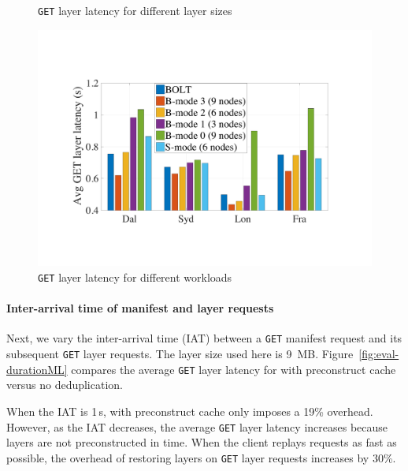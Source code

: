 \begin{figure}[t]
\begin{minipage}{0.3\textwidth}
		\caption{\texttt{GET} layer latency for different layer sizes}
		\label{fig:eval-dalprimary}
	\end{minipage}%
	\hspace{1mm}
	\begin{minipage}{0.3\textwidth}
		\centering
		\includegraphics[width=\textwidth]{graphs/total-traces.pdf}
		\caption{\texttt{GET} layer latency for different workloads} %
		\label{fig:eval-total-traces}
	\end{minipage}
\end{figure}
 
\paragraph{Inter-arrival time of manifest and layer requests}
%
Next, we vary the inter-arrival time (IAT) between a \texttt{GET} manifest request and its
subsequent \texttt{GET} layer requests.
%
The layer size used here is 9~MB.
%
Figure~\ref{fig:eval-durationML} compares the average \texttt{GET} layer latency for
\sysname with preconstruct cache versus no deduplication.

When the IAT is 1\,s, \sysname with preconstruct cache only imposes a 19\% overhead.
%
However, as the IAT decreases, the average \texttt{GET} layer latency increases because
layers are not preconstructed in time.
%
When the client replays requests as fast as possible, the overhead of restoring layers on
\texttt{GET} layer requests increases by 30\%.
%


